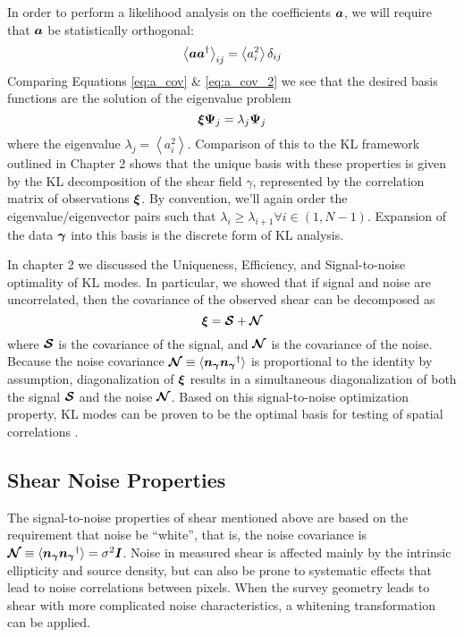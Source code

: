 In order to perform a likelihood analysis on the coefficients
$\boldsymbol{a}$, we will require that $\boldsymbol{a}$ be statistically orthogonal:
\begin{equation}
  \label{eq:a_cov_2}
  \left\langle \boldsymbol{a}\boldsymbol{a}^\dagger \right\rangle_{ij}
  = \left\langle a_i^2 \right\rangle \delta_{ij}
\end{equation}
Comparing Equations \ref{eq:a_cov} \& \ref{eq:a_cov_2} we see that the desired
basis functions are the solution of the eigenvalue problem
\begin{equation}
  \boldsymbol{\xi} \boldsymbol{\Psi}_j = \lambda_j \boldsymbol{\Psi}_j
\end{equation}
where the eigenvalue $\lambda_j = \left\langle a_i^2 \right\rangle$.
Comparison of this to the KL framework outlined in Chapter 2 shows that
the unique basis with these properties is given by the KL decomposition
of the shear field $\gamma$, represented by the correlation matrix
of observations $\boldsymbol{\xi}$.
By convention, we'll again order the eigenvalue/eigenvector pairs such that
$\lambda_i \ge \lambda_{i+1} \forall i\in(1, N-1)$.
Expansion of the data $\boldsymbol{\gamma}$ into this basis is the discrete form
of KL analysis.

In chapter 2 we discussed the Uniqueness, Efficiency, and Signal-to-noise
optimality of KL modes.  In particular, we showed that
if signal and noise are uncorrelated, then the covariance of the observed
shear can be decomposed as
\begin{equation}
  \boldsymbol{\xi} = \boldsymbol{\mathcal{S}} + \boldsymbol{\mathcal{N}}
\end{equation}
where $\boldsymbol{\mathcal{S}}$ is the covariance of the signal, and
$\boldsymbol{\mathcal{N}}$ is the covariance of the noise.
Because the noise covariance $\boldsymbol{\mathcal{N}} \equiv 
\langle\boldsymbol{n_\gamma}\boldsymbol{n_\gamma}^\dagger\rangle$ is proportional
to the identity by assumption, diagonalization of $\boldsymbol{\xi}$ results
in a simultaneous diagonalization of both the signal $\boldsymbol{\mathcal{S}}$
and the noise $\boldsymbol{\mathcal{N}}$.  Based on this signal-to-noise
optimization property, KL modes can be proven to be the optimal basis
for testing of spatial correlations \citep[see Appendix A of][]{Vogeley96}.

\subsection{Shear Noise Properties}
\label{sec:whitening}
The signal-to-noise properties of shear mentioned above are based on the 
requirement that noise be ``white'', that is, the noise covariance is
$\boldsymbol{\mathcal{N}} \equiv 
\langle\boldsymbol{n_\gamma}\boldsymbol{n_\gamma}^\dagger\rangle
= \sigma^2 \boldsymbol{I}$.  Noise in measured shear is affected mainly by the
intrinsic ellipticity and source density, but can also be prone to systematic
effects that lead to noise correlations between pixels.  When the survey
geometry leads to shear with more complicated noise characteristics, a
whitening transformation can be applied.


